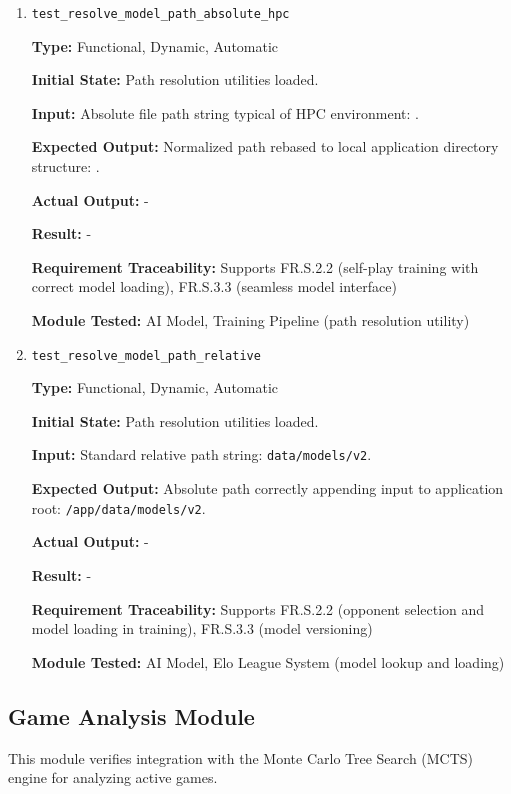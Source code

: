 \documentclass[12pt, titlepage]{article}
\begin{document}
\begin{enumerate}

\item \texttt{test\_resolve\_model\_path\_absolute\_hpc}

\textbf{Type:} Functional, Dynamic, Automatic

\textbf{Initial State:} Path resolution utilities loaded.

\textbf{Input:} Absolute file path string typical of HPC environment: .

\textbf{Expected Output:} Normalized path rebased to local application directory structure: .

\textbf{Actual Output:} -

\textbf{Result:} -

\textbf{Requirement Traceability:} Supports FR.S.2.2 (self-play training with correct model loading), FR.S.3.3 (seamless model interface)

\textbf{Module Tested:} AI Model, Training Pipeline (path resolution utility)


\item \texttt{test\_resolve\_model\_path\_relative}

\textbf{Type:} Functional, Dynamic, Automatic

\textbf{Initial State:} Path resolution utilities loaded.

\textbf{Input:} Standard relative path string: \texttt{data/models/v2}.

\textbf{Expected Output:} Absolute path correctly appending input to application root: \texttt{/app/data/models/v2}.

\textbf{Actual Output:} -

\textbf{Result:} -

\textbf{Requirement Traceability:} Supports FR.S.2.2 (opponent selection and model loading in training), FR.S.3.3 (model versioning)

\textbf{Module Tested:} AI Model, Elo League System (model lookup and loading)

\end{enumerate}

\subsection{Game Analysis Module}

This module verifies integration with the Monte Carlo Tree Search (MCTS) engine for analyzing active games.
\end{document}
